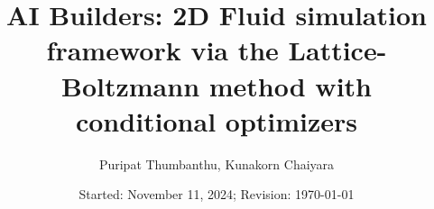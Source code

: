 \documentclass[b5paper, 11pt, openleft]{memoir}
\begin{document}
\frontmatter
\title{
	\vspace{-5em}
	\textbf{
		AI Builders: 2D Fluid simulation framework via the Lattice-Boltzmann method with conditional optimizers
	}
}
\author{
	Puripat Thumbanthu, Kunakorn Chaiyara \\
}
\date{Started: November 11, 2024; Revision: \today}
\maketitle

\tableofcontents*

\mainmatter






\printbibliography
\end{document}
